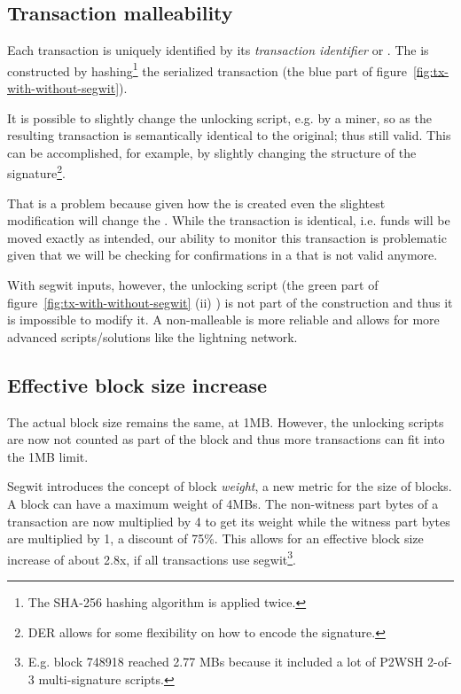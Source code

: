 \subsection*{Transaction malleability}
Each transaction is uniquely identified by its \emph{transaction identifier} or . The  is constructed by hashing\footnote{The SHA-256 hashing algorithm is applied twice.} the serialized transaction (the blue part of figure~\ref{fig:tx-with-without-segwit}).

It is possible to slightly change the unlocking script, e.g. by a miner, so as the resulting transaction is semantically identical to the original; thus still valid. This can be accomplished, for example, by slightly changing the structure of the signature\footnote{DER allows for some flexibility on how to encode the signature.}.

That is a problem because given how the  is created even the slightest modification will change the . While the transaction is identical, i.e. funds will be moved exactly as intended, our ability to monitor this transaction is problematic given that we will be checking for confirmations in a  that is not valid anymore.

With segwit inputs, however, the unlocking script (the green part of figure~\ref{fig:tx-with-without-segwit} (ii) ) is not part of the  construction and thus it is impossible to modify it. A non-malleable  is more reliable and allows for more advanced scripts/solutions like the lightning network.


\subsection*{Effective block size increase}
The actual block size remains the same, at 1MB. However, the unlocking scripts are now not counted as part of the block and thus more transactions can fit into the 1MB limit.

Segwit introduces the concept of block \emph{weight}, a new metric for the size of blocks. A block can have a maximum weight of 4MBs. The non-witness part bytes of a transaction are now multiplied by 4 to get its weight while the witness part bytes are multiplied by 1, a discount of 75\%. This allows for an effective block size increase of about 2.8x, if all transactions use segwit\footnote{E.g. block 748918 reached 2.77 MBs because it included a lot of P2WSH 2-of-3 multi-signature scripts.}.

